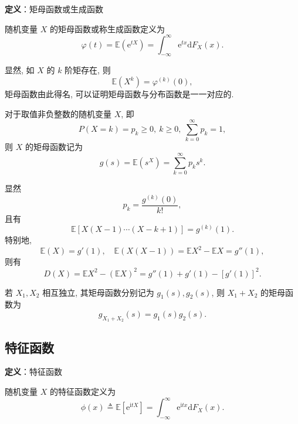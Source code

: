 \documentclass[openany]{ctexbook}
\theoremstyle{kaiti}
\theoremstyle{normal}
\begin{document}
\textbf{定义}：矩母函数或生成函数

随机变量 $X$ 的矩母函数或称生成函数定义为
\begin{equation}
  \varphi(t)=\mathbb{E}(\mathrm{e}^{tX})=\int_{-\infty}^\infty\mathrm{e}^{tx}\mathrm{d}F_X(x).
\end{equation}

显然, 如 $X$ 的 $k$ 阶矩存在, 则
\begin{equation}
\mathbb{E}(X^k)=\varphi^{(k)}(0),\end{equation} 矩母函数由此得名, 可以证明矩母函数与分布函数是一一对应的.

对于取值非负整数的随机变量 $X$, 即
\begin{equation}
  P(X=k)=p_k\geqslant0,~k\geqslant0,~\sum_{k=0}^\infty p_k=1,
\end{equation}
 则 $X$ 的矩母函数记为
\begin{equation}
  g(s)=\mathbb{E}(s^X)=\sum_{k=0}^\infty p_ks^k.
\end{equation}

显然
\begin{equation}
  p_k=\frac{g^{(k)}(0)}{k!},
\end{equation}
 且有
\begin{equation}
  \mathbb{E}[X(X-1)\cdots(X-k+1)]=g^{(k)}(1).
\end{equation}
 特别地,
\begin{equation}
  \mathbb{E}(X)=g'(1),\quad \mathbb{E}(X(X-1))=\mathbb{E}X^2-\mathbb{E}X=g''(1),
\end{equation}
 则有
\begin{equation}
  D(X)=\mathbb{E}X^2-(\mathbb{E}X)^2=g''(1)+g'(1)-[g'(1)]^2.
\end{equation}


若 $X_1,X_2$ 相互独立, 其矩母函数分别记为 $g_1(s),g_2(s)$, 则 $X_1+X_2$ 的矩母函数为
\begin{equation}
  g_{X_1+X_2}(s)=g_1(s)g_2(s).
\end{equation}


\subsection{特征函数}

\textbf{定义}：特征函数

随机变量 $X$ 的特征函数定义为 
\begin{equation}
  \phi(x)\triangleq \mathbb{E}[\mathrm{e}^{\mathrm{i}tX}]=\int_{-\infty}^\infty\mathrm{e}^{\mathrm{i}tx}\mathrm{d}F_X(x).
\end{equation}
\end{document}
